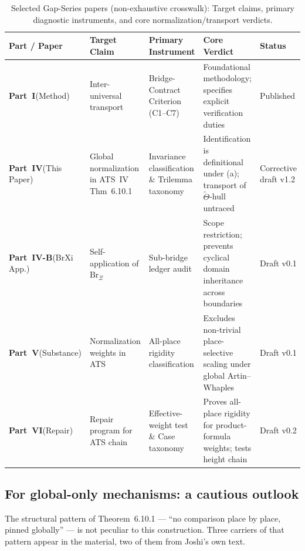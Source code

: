 \documentclass[11pt,a4paper]{article}
\theoremstyle{definition}
\theoremstyle{plain}
\theoremstyle{definition}
\newcommand{\Thet}{\widetilde{\Theta}}
\begin{document}
\begin{table}[htbp]
\centering
\caption{Selected Gap-Series papers (non-exhaustive crosswalk): Target claims, primary diagnostic instruments, and core normalization/transport verdicts.}
\label{tab:gap_series_crosswalk}
\small
\setlength{\tabcolsep}{3.5pt}
\begin{tabular}{@{}P{0.14\textwidth}P{0.19\textwidth}P{0.20\textwidth}P{0.27\textwidth}P{0.12\textwidth}@{}}
\toprule
Part / Paper & Target Claim & Primary Instrument & Core Verdict & Status \\
\midrule
\textbf{Part~I}\newline (Method)
  & Inter-universal transport
  & Bridge-Contract Criterion (C1--C7)
  & Foundational methodology; specifies explicit verification duties
  & Published \\[3pt]
\textbf{Part~IV}\newline (This Paper)
  & Global normalization in ATS~IV Thm~6.10.1
  & Invariance classification \& Trilemma taxonomy
  & Identification is definitional under (a); transport of $\Thet$-hull untraced
  & Corrective draft v1.2 \\[3pt]
\textbf{Part~IV-B}\newline (BrXi App.)
  & Self-application of $\mathrm{Br}_{\Xi}$
  & Sub-bridge ledger audit
  & Scope restriction; prevents cyclical domain inheritance across boundaries
  & Draft v0.1 \\[3pt]
\textbf{Part~V}\newline (Substance)
  & Normalization weights in ATS
  & All-place rigidity classification
  & Excludes non-trivial place-selective scaling under global Artin--Whaples
  & Draft v0.1 \\[3pt]
\textbf{Part~VI}\newline (Repair)
  & Repair program for ATS chain
  & Effective-weight test \& Case taxonomy
  & Proves all-place rigidity for product-formula weights; tests height chain
  & Draft v0.2 \\
\bottomrule
\end{tabular}
\end{table}

\subsection{For global-only mechanisms: a cautious outlook}
\label{sec:b2outlook}

The structural pattern of Theorem~6.10.1 --- ``no comparison place by place, pinned
globally'' --- is not peculiar to this construction. Three carriers of that pattern
appear in the material, two of them from Joshi's own text.
\end{document}
